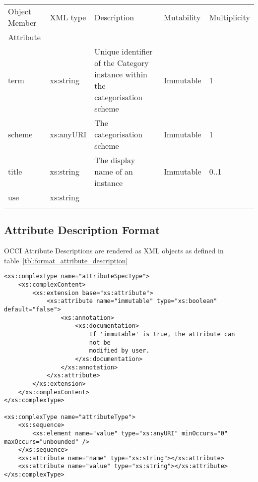\documentclass[10pt,a4paper]{article}
\begin{document}
\mytablefloat{
    \label{tbl:format_category}
	}
	{
    \begin{tabularx}{\textwidth}{llXll}
    \toprule
    Object Member & XML type & Description & Mutability & Multiplicity \\
    \colrule
    Attribute \\
    term & xs:string & Unique identifier of the Category instance within the categorisation scheme & Immutable & 1 \\
    scheme & xs:anyURI & The categorisation scheme & Immutable & 1 \\
    title & xs:string & The display name of an instance & Immutable & 0..1 \\
    use & xs:string & & & \\
    \botrule
    \end{tabularx}
}

\subsection{Attribute Description Format}
\label{sec:format_attribute_description}

OCCI Attribute Descriptions are rendered as XML objects as defined in table~\ref{tbl:format_attribute_description}
\begin{lstlisting}
<xs:complexType name="attributeSpecType">
	<xs:complexContent>
		<xs:extension base="xs:attribute">
			<xs:attribute name="immutable" type="xs:boolean" default="false">
				<xs:annotation>
					<xs:documentation>
						If 'immutable' is true, the attribute can
						not be
						modified by user.
					</xs:documentation>
				</xs:annotation>
			</xs:attribute>
		</xs:extension>
	</xs:complexContent>
</xs:complexType>

<xs:complexType name="attributeType">
	<xs:sequence>
		<xs:element name="value" type="xs:anyURI" minOccurs="0" maxOccurs="unbounded" />
	</xs:sequence>
	<xs:attribute name="name" type="xs:string"></xs:attribute>
	<xs:attribute name="value" type="xs:string"></xs:attribute>
</xs:complexType>
\end{lstlisting}
\end{document}
